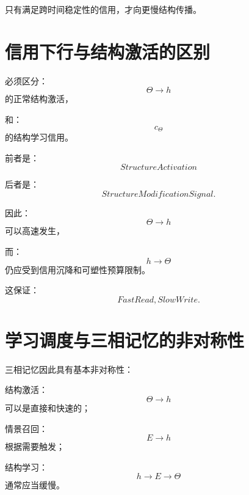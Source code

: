 只有满足跨时间稳定性的信用，才向更慢结构传播。


\section{信用下行与结构激活的区别}

必须区分：
\begin{equation}
\Theta\rightarrow h
\end{equation}
的正常结构激活，

和：
\begin{equation}
c_\Theta
\end{equation}
的结构学习信用。

前者是：
\begin{equation}
\boxed{
StructureActivation
}
\end{equation}

后者是：
\begin{equation}
\boxed{
StructureModificationSignal.
}
\end{equation}

因此：
\begin{equation}
\Theta
\rightarrow
h
\end{equation}
可以高速发生，

而：
\begin{equation}
h
\rightarrow
\Theta
\end{equation}
仍应受到信用沉降和可塑性预算限制。

这保证：
\begin{equation}
\boxed{
FastRead,
SlowWrite.
}
\end{equation}


\section{学习调度与三相记忆的非对称性}

三相记忆因此具有基本非对称性：

结构激活：
\begin{equation}
\Theta
\rightarrow
h
\end{equation}
可以是直接和快速的；

情景召回：
\begin{equation}
E
\rightarrow
h
\end{equation}
根据需要触发；

结构学习：
\begin{equation}
h
\rightarrow
E
\rightarrow
\Theta
\end{equation}
通常应当缓慢。

